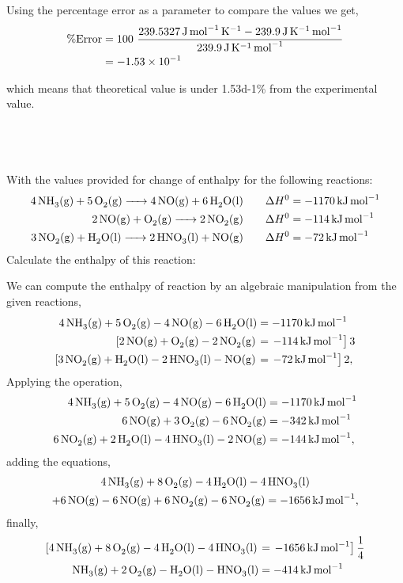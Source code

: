\documentclass[main.tex]{subfiles}
\begin{document}
Using the percentage error as a parameter to compare the values we get,
\begin{align*}
    \%\mathrm{Error} &= 100~\frac{\SI{239.5327}{\joule\per\mole\per\kelvin} - \SI{239.9}{\joule\per\kelvin\per\mole}}{\SI{239.9}{\joule\per\kelvin\per\mole}} \\
    &= -\num{1.53d-1}
\end{align*}

which means that theoretical value is under \num{1.53d-1}\% from the experimental value.

\subsection{~}

With the values provided for change of enthalpy for the following reactions:
\begin{align*}
    \ce{4NH3(g) + 5O2(g) -> 4NO(g) + 6H2O(l)} &\qquad \Delta H^0 = -\SI{1170}{\kilo\joule\per\mole} \\
    \ce{2NO(g) + O2(g) -> 2NO2(g)} &\qquad \Delta H^0 = -\SI{114}{\kilo\joule\per\mole} \\
    \ce{3NO2(g) + H2O(l) -> 2HNO3(l) + NO(g)} &\qquad \Delta H^0 = -\SI{72}{\kilo\joule\per\mole}
\end{align*}
Calculate the enthalpy of this reaction: 

We can compute the enthalpy of reaction by an algebraic manipulation from the given reactions, 
\begin{align*}
    \ce{4NH3(g)} + \ce{5O2(g)} -\ce{4NO(g)} - \ce{6H2O(l)} &= -\SI{1170}{\kilo\joule\per\mole} \\
    \left[\ce{2NO(g)} + \ce{O2(g)} - \ce{2NO2(g)} \right. &= \left.-\SI{114}{\kilo\joule\per\mole}\right]3 \\
    \left[\ce{3NO2(g)} + \ce{H2O(l)} - \ce{2HNO3(l)} - \ce{NO(g)} \right. &= \left.-\SI{72}{\kilo\joule\per\mole}\right]2,
\end{align*}
Applying the operation,
\begin{align*}
    \ce{4NH3(g)} + \ce{5O2(g)} -\ce{4NO(g)} - \ce{6H2O(l)} &= -\SI{1170}{\kilo\joule\per\mole} \\
    \ce{6NO(g)} + \ce{3O2(g)} - \ce{6NO2(g)} &= -\SI{342}{\kilo\joule\per\mole} \\
    \ce{6NO2(g)} + \ce{2H2O(l)} - \ce{4HNO3(l)} - \ce{2NO(g)} &= -\SI{144}{\kilo\joule\per\mole},
\end{align*}
adding the equations,
\begin{multline*}
   \ce{4NH3(g)} + \ce{8O2(g)}  - \ce{4H2O(l)}- \ce{4HNO3(l)}\\
   + \ce{6NO(g)} -\ce{6NO(g)} + \ce{6NO2(g)}- \ce{6NO2(g)}  
  =-\SI{1656}{\kilo\joule\per\mole},
\end{multline*}
finally,
\begin{align*}
    \left[\ce{4NH3(g)} + \ce{8O2(g)}  - \ce{4H2O(l)}- \ce{4HNO3(l)}\right. &= \left.-\SI{1656}{\kilo\joule\per\mole}\right]\frac{1}{4} \\
    \ce{NH3(g)} + \ce{2O2(g)}  - \ce{H2O(l)}- \ce{HNO3(l)} &= -\SI{414}{\kilo\joule\per\mole}
\end{align*}
\end{document}

